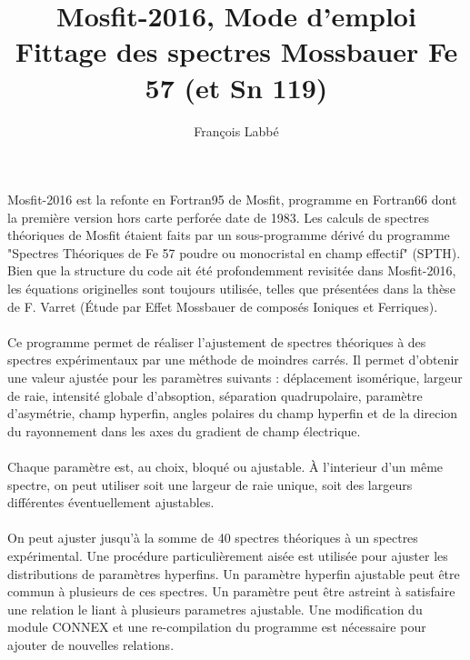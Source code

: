 \documentclass[a4paper]{article}
\begin{document}
\title{Mosfit-2016, Mode d'emploi \\Fittage des spectres Mossbauer Fe 57 (et Sn 119)}
\author{Fran\c{c}ois Labb\'e}
\maketitle

\paragraph{}
Mosfit-2016 est la refonte en Fortran95 de Mosfit, programme en Fortran66 dont la première version hors carte perforée date de 1983.
Les calculs de spectres théoriques de Mosfit étaient faits par un sous-programme dérivé du programme "Spectres Théoriques de Fe 57 poudre ou monocristal en champ effectif" (SPTH). 
Bien que la structure du code ait été profondemment revisitée dans Mosfit-2016, les équations originelles sont toujours utilisée, telles que présentées dans la thèse de F. Varret (\'Etude par Effet Mossbauer de composés Ioniques et Ferriques).


\paragraph{}
Ce programme permet de réaliser l'ajustement de spectres théoriques à des spectres expérimentaux par une méthode de moindres carrés.
Il permet d'obtenir une valeur ajustée pour les paramètres suivants : déplacement isomérique, largeur de raie, intensité globale d'absoption, 
séparation quadrupolaire, paramètre d'asymétrie, champ hyperfin, angles polaires du champ hyperfin et de la direcion du rayonnement dans les axes du gradient de champ électrique.

\paragraph{}
Chaque paramètre est, au choix, bloqué ou ajustable. À l'interieur d'un même spectre, on peut utiliser soit une largeur de raie unique, soit des largeurs différentes éventuellement ajustables. 

\paragraph{}
On peut ajuster jusqu'à la somme de 40 spectres théoriques à un spectres expérimental.
 Une procédure particulièrement aisée est utilisée pour ajuster les distributions de paramètres hyperfins.
 Un paramètre hyperfin ajustable peut être commun à plusieurs de ces spectres.
 Un paramètre peut être astreint à satisfaire une relation le liant à plusieurs parametres ajustable.
 Une modification du module CONNEX et une re-compilation du programme est nécessaire pour ajouter de nouvelles relations.
 
\end{document}
